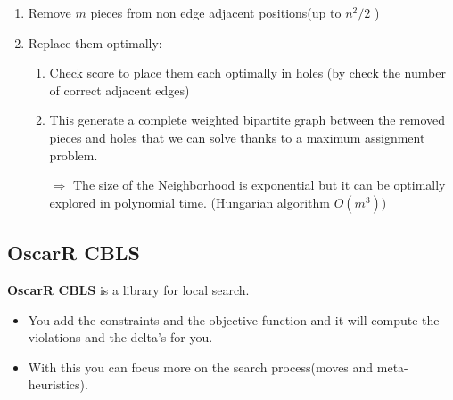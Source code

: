 \begin{enumerate}
    \item Remove $m$ pieces from non edge adjacent positions(up to $n^2/2$ ) 
    \item Replace them optimally:

        \begin{enumerate}
            \item Check score to place them each optimally in holes (by
                check the number of correct adjacent edges)
            \item This generate a complete weighted bipartite graph
                between the removed pieces and holes that we can solve
                thanks to a maximum assignment problem.

                $\Rightarrow$ The size of the Neighborhood is
                exponential but it can be optimally explored in
                polynomial time. (Hungarian algorithm $O(m^3)$)
                \end{enumerate}
\end{enumerate}


\subsection{OscarR CBLS}
\textbf{OscarR CBLS} is a library for local search.
\begin{itemize}
    \item You add the constraints and the objective function and it will
        compute the violations and the delta's for you.
    \item With this you can focus more on the search process(moves and meta-heuristics).
\end{itemize}

